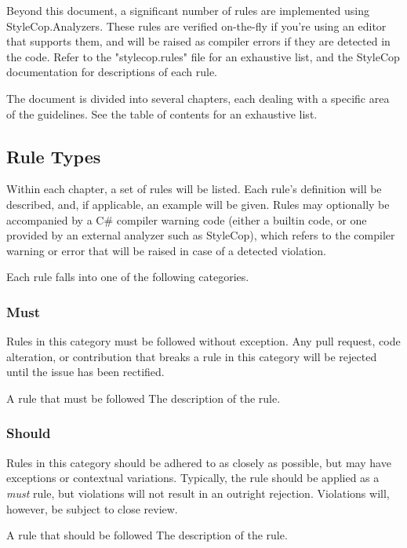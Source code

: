 \documentclass[11pt,a4paper]{article}
\newcounter{rule}[section]
\begin{document}
Beyond this document, a significant number of rules are implemented using StyleCop.Analyzers. These rules are verified on-the-fly if you're using an editor that supports them, and will be raised as compiler errors if they are detected in the code. Refer to the "stylecop.rules" file for an exhaustive list, and the StyleCop documentation for descriptions of each rule.

The document is divided into several chapters, each dealing with a specific area of the guidelines. See the table of contents for an exhaustive list.

\pagebreak
\subsection{Rule Types}
Within each chapter, a set of rules will be listed. Each rule's definition will be described, and, if applicable, an example will be given. Rules may optionally be accompanied by a C\# compiler warning code (either a builtin code, or one provided by an external analyzer such as StyleCop), which refers to the compiler warning or error that will be raised in case of a detected violation.

Each rule falls into one of the following categories.

\subsubsection{Must}
Rules in this category must be followed without exception. Any pull request, code alteration, or contribution that breaks a rule in this category will be rejected until the issue has been rectified.

\begin{must}[EX0001]{A rule that must be followed}
The description of the rule.
\end{must}

\subsubsection{Should}
Rules in this category should be adhered to as closely as possible, but may have exceptions or contextual variations. Typically, the rule should be applied as a \textit{must} rule, but violations will not result in an outright rejection. Violations will, however, be subject to close review.

\begin{should}[EX0002]{A rule that should be followed}
The description of the rule.
\end{should}
\end{document}
